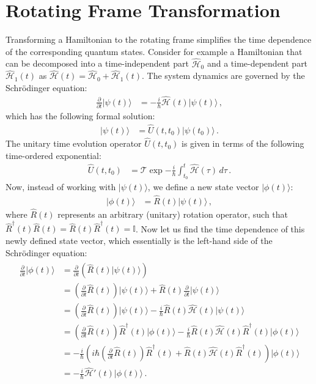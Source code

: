 \documentclass[../Thesis-IJspeert.tex]{subfiles}
\begin{document}
\chapter{Rotating Frame Transformation}
\label{rotatingframeapp}
Transforming a Hamiltonian to the rotating frame simplifies the time dependence of the corresponding quantum states. Consider for example a Hamiltonian that can be decomposed into a time-independent part $\hat{\mathcal{H}}_0$ and a time-dependent part $\hat{\mathcal{H}}_1(t)$ as $\hat{\mathcal{H}}(t) = \hat{\mathcal{H}}_0 + \hat{\mathcal{H}}_1(t)$. The system dynamics are governed by the Schrödinger equation:
\begin{align}
\frac{\partial}{\partial t} \lvert \psi(t) \rangle &= -\frac{i}{\hbar} \hat{\mathcal{H}}(t) \lvert \psi(t) \rangle\,,
\end{align}
which has the following formal solution:
\begin{align}
\lvert \psi(t) \rangle &= \hat{U}(t, t_0) \lvert \psi(t_0) \rangle\,.
\end{align}
The unitary time evolution operator $\hat{U}(t, t_0)$ is given in terms of the following time-ordered exponential:
\begin{align}
\hat{U}(t, t_0) &= \mathcal{T} \exp { -\frac{i}{\hbar} \int_{t_0}^{t} \hat{\mathcal{H}}(\tau) \, d\tau }\,.
\end{align}
Now, instead of working with $\lvert \psi(t) \rangle$, we define a new state vector $\lvert \phi(t) \rangle$:
\begin{align}
\lvert \phi(t) \rangle &= \hat{R}(t) \lvert \psi(t) \rangle\,,
\end{align}
where $\hat{R}(t)$ represents an arbitrary (unitary) rotation operator, such that $\hat{R}^{\dagger}(t) \hat{R}(t) = \hat{R}(t) \hat{R}^{\dagger}(t) = \mathbb{I}$. Now let us find the time dependence of this newly defined state vector, which essentially is the left-hand side of the Schrödinger equation:
\begin{align}
\begin{split}
\frac{\partial}{\partial t} \lvert \phi(t) \rangle &= \frac{\partial}{\partial t} \left( \hat{R}(t) \lvert \psi(t) \rangle \right) \\
&= \left( \frac{\partial}{\partial t} \hat{R}(t) \right) \lvert \psi(t) \rangle + \hat{R}(t) \frac{\partial}{\partial t} \lvert \psi(t) \rangle \\
&= \left( \frac{\partial}{\partial t} \hat{R}(t) \right) \lvert \psi(t) \rangle - \frac{i}{\hbar} \hat{R}(t) \hat{\mathcal{H}}(t) \lvert \psi(t) \rangle \\
&= \left( \frac{\partial}{\partial t} \hat{R}(t) \right) \hat{R}^{\dagger}(t) \lvert \phi(t) \rangle - \frac{i}{\hbar} \hat{R}(t) \hat{\mathcal{H}}(t) \hat{R}^{\dagger}(t) \lvert \phi(t) \rangle \\
&= -\frac{i}{\hbar} \left( i \hbar \left( \frac{\partial}{\partial t} \hat{R}(t) \right) \hat{R}^{\dagger}(t) + \hat{R}(t) \hat{\mathcal{H}}(t) \hat{R}^{\dagger}(t) \right) \lvert \phi(t) \rangle \\
&= -\frac{i}{\hbar} \hat{\mathcal{H}}'(t) \lvert \phi(t) \rangle\,.
\end{split}
\end{align}
\end{document}
